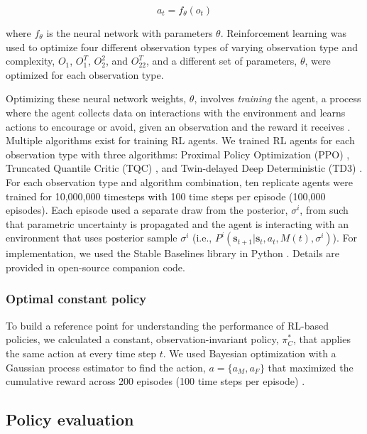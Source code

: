 \documentclass{article}
\begin{document}
\begin{equation}
a_t = f_{\theta}(o_t)
\end{equation}

where $f_\theta$ is the neural network with parameters $\theta$. Reinforcement learning was used to optimize four different observation types of varying observation type and complexity, $O_1$, $O_1^T$, $O^2_2$, and $O_{22}^T$, and a different set of parameters, $\theta$, were optimized for each observation type. 

Optimizing these neural network weights, $\theta$, involves \textit{training} the agent, a process where the agent collects data on interactions with the environment and learns actions to encourage or avoid, given an observation and the reward it receives \parencite{lapeyrolerie2022deep}. Multiple algorithms exist for training RL agents. We trained RL agents for each observation type with three algorithms: Proximal Policy Optimization (PPO) \parencite{schulman2017ppo}, Truncated Quantile Critic (TQC) \parencite{kuznetsov2020tqc}, and Twin-delayed Deep Deterministic (TD3) \parencite{fujimoto2018addressing}. For each observation type and algorithm combination, ten replicate agents were trained for 10,000,000 timesteps with 100 time steps per episode (100,000 episodes). Each episode used a separate draw from the posterior, $\sigma^i$, from \cite{keller2026integrated} such that parametric uncertainty is propagated and the agent is interacting with an environment that uses posterior sample $\sigma^i$ (i.e., $P^i(\textbf{s}_{t+1}|\textbf{s}_t,a_t, M(t), \sigma^i)$). For implementation, we used the Stable Baselines library in Python \parencite{stable-baselines3}. Details are provided in open-source companion code.

\subsubsection{Optimal constant policy}

To build a reference point for understanding the performance of RL-based policies, we calculated a constant, observation-invariant policy, $\pi^*_C$, that applies the same action at every time step $t$. We used Bayesian optimization with a Gaussian process estimator to find the action, $a = \{a_M, a_F\}$ that maximized the cumulative reward across 200 episodes (100 time steps per episode) \parencite{skopt}.

\subsection{Policy evaluation}
\end{document}
